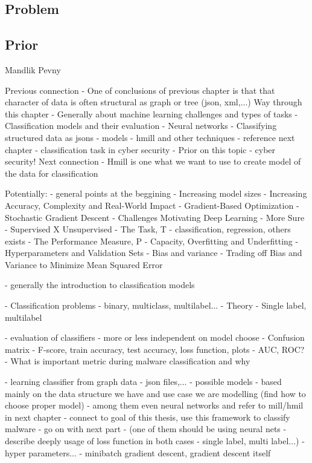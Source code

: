 \subsection{Problem}
\subsection{Prior}
Mandlik
Pevny




Previous connection
- One of conclusions of previous chapter is that that character of data is often structural as graph or tree (json, xml,...)
Way through this chapter
- Generally about machine learning challenges and types of tasks
- Classification models and their evaluation
- Neural networks
- Classifying structured data as jsons - models
    - hmill and other techniques - reference next chapter
- classification task in cyber security
- Prior on this topic - cyber security!
Next connection
- Hmill is one what we want to use to create model of the data for classification


\cite{GoodBengCour16}
Potentially:
- general points at the beggining
    - Increasing model sizes
    - Increasing Accuracy, Complexity and Real-World Impact
    - Gradient-Based Optimization
    - Stochastic Gradient Descent
    - Challenges Motivating Deep Learning
- More Sure
    - Supervised X Unsupervised
    - The Task, T - classification, regression, others exists
    - The Performance Measure, P
    - Capacity, Overfitting and Underfitting
    - Hyperparameters and Validation Sets
    - Bias and variance - Trading off Bias and Variance to Minimize Mean Squared
    Error

\cite{Bishop2006}
 - generally the introduction to classification models


- Classification problems - binary, multiclass, multilabel...
- Theory
- Single label, multilabel

- evaluation of classifiers - more or less independent on model choose
  - Confusion matrix
  - F-score, train accuracy, test accuracy, loss function, plots
        - AUC, ROC?
  - What is important metric during malware classification and why


- learning classifier from graph data - json files,...
- possible models - based mainly on the data structure we have and use case we are modelling (find how to choose proper model)
    - among them even neural networks and refer to mill/hmil in next chapter - connect to goal of this thesis, use this framework to classify malware - go on with next part
- (one of them should be using neural nets - describe deeply usage of loss function in both cases - single label, multi label...)
- hyper parameters...
- minibatch gradient descent, gradient descent itself

